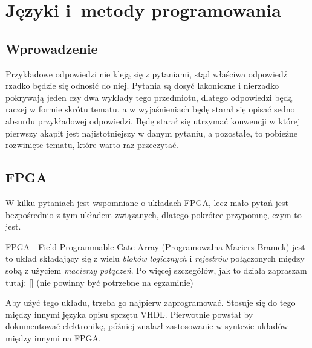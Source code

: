 \chapter{Języki i~metody programowania}
\PartialToc

\newtheorem{pyt}{Pytanie}
\newtheorem{odp}{Odpowiedź}

\newenvironment{opracowanie}[1][1]{
	\newcounter{nr_pytania}
	\setcounter{nr_pytania}{#1}
}{}
\newcommand{\pytanie}[1]
{
\section{\arabic{nr_pytania}. IT1A\_W08,IT1A\_U8}
\stepcounter{nr_pytania}
\pyt \textbf{#1}
\par
}

\section{Wprowadzenie}

Przykładowe odpowiedzi nie kleją się z pytaniami, stąd właściwa odpowiedź rzadko będzie się odnosić do niej.
Pytania są dosyć lakoniczne i nierzadko pokrywają jeden czy dwa wykłady tego przedmiotu, dlatego odpowiedzi będą raczej w formie skrótu tematu, a w wyjaśnieniach będę starał się opisać sedno absurdu przykładowej odpowiedzi.
Będę starał się utrzymać konwencji w której pierwszy akapit jest najistotniejszy w danym pytaniu, a pozostałe, to pobieżne rozwinięte tematu, które warto raz przeczytać.

\section{FPGA}

W kilku pytaniach jest wspomniane o układach FPGA, lecz mało pytań jest bezpośrednio z tym układem związanych, dlatego pokrótce przypomnę, czym to jest.

FPGA - Field-Programmable Gate Array (Programowalna Macierz Bramek) jest to układ składający się z wielu \emph{bloków logicznych} i \emph{rejestrów} połączonych między sobą z użyciem \emph{macierzy połączeń}. Po więcej szczegółów, jak to działa zapraszam tutaj: [\cite{fpga:hiw}] (nie powinny być potrzebne na egzaminie)

Aby użyć tego układu, trzeba go najpierw zaprogramować. Stosuje się do tego między innymi języka opisu sprzętu VHDL. Pierwotnie powstał by dokumentować elektronikę, później znalazł zastosowanie w syntezie układów między innymi na FPGA.

